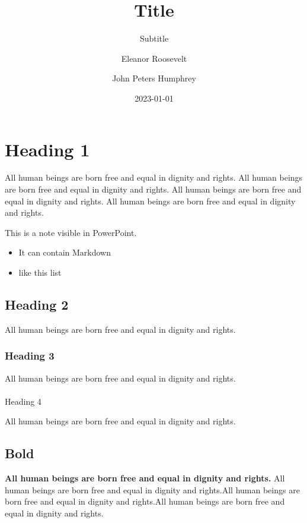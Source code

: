 \documentclass[
  english,
  american,
]{beamer}
\title{Title}
\subtitle{Subtitle}
\author{Eleanor Roosevelt \and John Peters Humphrey}
\date{2023-01-01}
\makeatletter
\let\oldparagraph\paragraph
\renewcommand{\paragraph}{
    \@ifstar
      \xxxParagraphStar
      \xxxParagraphNoStar
  }
\newcommand{\xxxParagraphStar}[1]{\oldparagraph*{#1}\mbox{}}
\newcommand{\xxxParagraphNoStar}[1]{\oldparagraph{#1}\mbox{}}
\providecommand{\tightlist}{%
  \setlength{\itemsep}{0pt}\setlength{\parskip}{0pt}}
\makeatother
\begin{document}
\maketitle


\section{Heading 1}\label{heading-1}

All human beings are born free and equal in dignity and rights. All
human beings are born free and equal in dignity and rights. All human
beings are born free and equal in dignity and rights. All human beings
are born free and equal in dignity and rights.

This is a note visible in PowerPoint.

\begin{itemize}
\tightlist
\item
  It can contain Markdown
\item
  like this list
\end{itemize}

\subsection{Heading 2}\label{heading-2}

All human beings are born free and equal in dignity and rights.

\subsubsection{Heading 3}\label{heading-3}

All human beings are born free and equal in dignity and rights.

\paragraph{Heading 4}\label{heading-4}

All human beings are born free and equal in dignity and rights.

\subsection{Bold}\label{bold}

\textbf{All human beings are born free and equal in dignity and rights.}
All human beings are born free and equal in dignity and rights.All human
beings are born free and equal in dignity and rights.All human beings
are born free and equal in dignity and rights.
\end{document}

